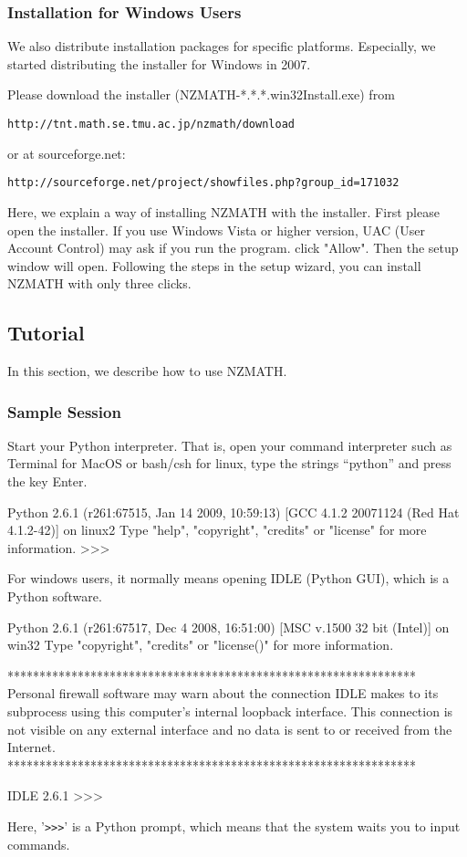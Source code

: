 \subsubsection{Installation for Windows Users}\label{windows install}
We also distribute installation packages for specific platforms.
Especially, we started distributing the installer for Windows in 2007.

Please download the installer (NZMATH-*.*.*.win32Install.exe) from
\begin{verbatim}
http://tnt.math.se.tmu.ac.jp/nzmath/download
\end{verbatim}
or at sourceforge.net:
\begin{verbatim}
http://sourceforge.net/project/showfiles.php?group_id=171032
\end{verbatim}

Here, we explain a way of installing NZMATH with the installer.
First please open the installer.
If you use Windows Vista or higher version, 
UAC (User Account Control) may ask if you run the program. click "Allow".
Then the setup window will open.
Following the steps in the setup wizard, 
you can install NZMATH with only three clicks.
%
\subsection{Tutorial}\label{tutorial}
  In this section, we describe how to use NZMATH.
\subsubsection{Sample Session}
  Start your Python interpreter.
  That is, open your command interpreter such as Terminal for MacOS or bash/csh for linux, type the strings ``python'' and press the key Enter.
\begin{ex}
Python 2.6.1 (r261:67515, Jan 14 2009, 10:59:13)
[GCC 4.1.2 20071124 (Red Hat 4.1.2-42)] on linux2
Type "help", "copyright", "credits" or "license" for more information.
>>>
\end{ex}
  For windows users, it normally means opening IDLE (Python GUI), which is a Python software. 
\begin{ex}
Python 2.6.1 (r261:67517, Dec  4 2008, 16:51:00) [MSC v.1500 32 bit (Intel)] on win32
Type "copyright", "credits" or "license()" for more information.

    ****************************************************************
    Personal firewall software may warn about the connection IDLE
    makes to its subprocess using this computer's internal loopback
    interface.  This connection is not visible on any external
    interface and no data is sent to or received from the Internet.
    ****************************************************************
    
IDLE 2.6.1      
>>> 
\end{ex}
Here, '\verb+>>>+' is a Python prompt, which means that the system waits you to input commands.

